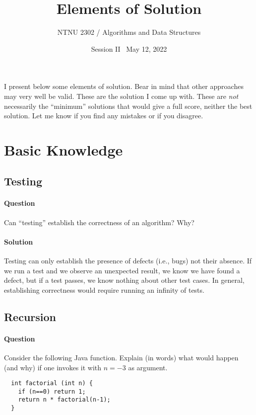 \documentclass{article}
\title{Elements of Solution}
\author{NTNU 2302 / Algorithms and Data Structures}
\date{Session II \textbullet\ May 12, 2022}
\begin{document}
\maketitle

I present below some elements of solution. Bear in mind that other
approaches may very well be valid. These are the solution I come up
with. These are \emph{not} necessarily the ``minimum'' solutions that
would give a full score, neither the best solution. Let me know if you
find any mistakes or if you disagree.

\section{Basic Knowledge}

\subsection{Testing}

\paragraph{Question} Can ``testing'' establish the correctness of an
algorithm? Why?

\paragraph{Solution} Testing can only establish the presence of
defects (i.e., bugs) not their absence. If we run a test and we
observe an unexpected result, we know we have found a defect, but if a
test passes, we know nothing about other test cases. In general,
establishing correctness would require running an infinity of tests.


\subsection{Recursion}

\paragraph{Question} Consider the following Java function. Explain (in
words) what would happen (and why) if one invokes it with $n=-3$ as argument.
\begin{verbatim}
  int factorial (int n) {
    if (n==0) return 1;
    return n * factorial(n-1);
  }
\end{verbatim}
\end{document}
